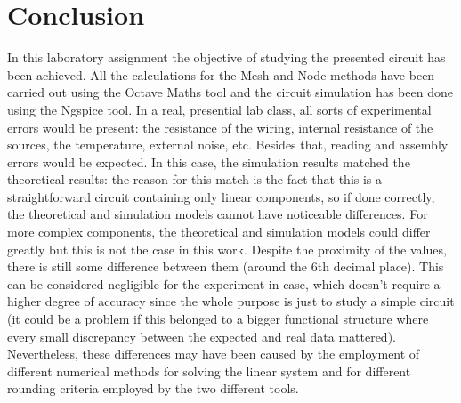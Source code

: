 \section{Conclusion}
\label{sec:conclusion}

In this laboratory assignment the objective of studying the presented circuit has been achieved. All the calculations for the Mesh and Node methods have been carried out using the Octave Maths tool and the circuit simulation has been done using the Ngspice tool. In a real, presential lab class, all sorts of experimental errors would be present: the resistance of the wiring, internal resistance of the sources, the temperature, external noise, etc. Besides that, reading and assembly errors would be expected. In this case, the simulation results matched the theoretical results: the reason for this match is the fact that this is a straightforward circuit containing only linear components, so if done correctly, the theoretical and simulation models cannot have noticeable differences. For more complex components, the theoretical and simulation models could differ greatly but this is not the case in this work. Despite the proximity of the values, there is still some difference between them (around the 6th decimal place). This can be considered negligible for the experiment in case, which doesn’t require a higher degree of accuracy since the whole purpose is just to study a simple circuit (it could be a problem if this belonged to a bigger functional structure where every small discrepancy between the expected and real data mattered). Nevertheless, these differences may have been caused by the employment of different numerical methods for solving the linear system and for different rounding criteria employed by the two different tools.
